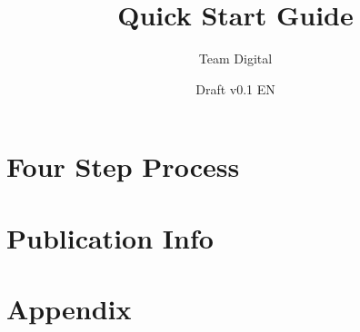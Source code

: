 \documentclass[11pt]{book}
\title{Quick Start Guide}
\author{Team Digital}
\date{Draft v0.1 EN}
\begin{document}
\maketitle
\def\title#1{\chapter{#1}}
\tableofcontents

        
        
        
        
        
        
\part{Four Step Process}
        
        
        
        
        
        
        
        
\part{Publication Info}
        
        
\part{Appendix}
        
        
\end{document}
